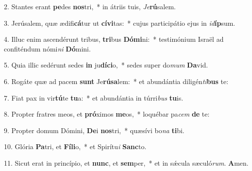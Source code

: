 2. Stantes erant \textbf{pe}des \textbf{nos}tri,~* in átriis tuis, \textit{Je}\textbf{rú}salem.

3. Jerúsalem, quæ ædifi\textbf{cá}tur ut \textbf{cí}\textbf{vi}tas:~* cujus participátio ejus in \textit{id}\textbf{íp}sum.

4. Illuc enim ascendérunt tribus, \textbf{tri}bus \textbf{Dó}\textbf{mi}ni:~* testimónium Israël ad confiténdum nómi\textit{ni} \textbf{Dó}mini.

5. Quia illic sedérunt sedes \textbf{in} ju\textbf{dí}\textbf{ci}o,~* sedes super do\textit{mum} \textbf{Da}vid.

6. Rogáte quæ ad pacem \textbf{sunt} Je\textbf{rú}\textbf{sa}lem:~* et abundántia diligén\textit{ti}\textbf{bus} te:

7. Fiat pax in vir\textbf{tú}te \textbf{tu}a:~* et abundántia in túrri\textit{bus} \textbf{tu}is.

8. Propter fratres meos, et \textbf{pró}ximos \textbf{me}os,~* loquébar pa\textit{cem} \textbf{de} te:

9. Propter domum Dómini, \textbf{De}i \textbf{nos}tri,~* quæsívi bo\textit{na} \textbf{ti}bi.

10. Glória \textbf{Pa}tri, et \textbf{Fí}\textbf{li}o,~* et Spirítu\textit{i} \textbf{Sanc}to.

11. Sicut erat in princípio, et \textbf{nunc}, et \textbf{sem}per,~* et in sǽcula sæculó\textit{rum}. \textbf{A}men.